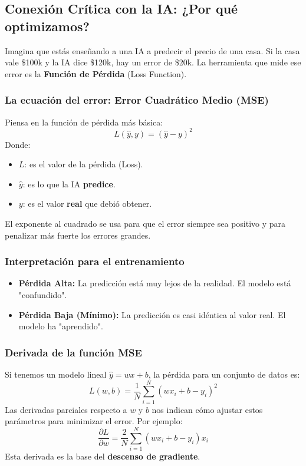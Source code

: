 \documentclass[12pt,a4paper,openany,oneside]{book}
\begin{document}
\subsection{Conexión Crítica con la IA: ¿Por qué optimizamos?}
Imagina que estás enseñando a una IA a predecir el precio de una casa. Si la casa vale \$100k y la IA dice \$120k, hay un error de \$20k. La herramienta que mide ese error es la \textbf{Función de Pérdida} (Loss Function).

\subsubsection{La ecuación del error: Error Cuadrático Medio (MSE)}
Piensa en la función de pérdida más básica:
\[
L(\hat{y}, y) = (\hat{y} - y)^2
\]
Donde:
\begin{itemize}
    \item $L$: es el valor de la pérdida (Loss).
    \item $\hat{y}$: es lo que la IA \textbf{predice}.
    \item $y$: es el valor \textbf{real} que debió obtener.
\end{itemize}
El exponente al cuadrado se usa para que el error siempre sea positivo y para penalizar más fuerte los errores grandes.

\subsubsection{Interpretación para el entrenamiento}
\begin{itemize}
    \item \textbf{Pérdida Alta:} La predicción está muy lejos de la realidad. El modelo está "confundido".
    \item \textbf{Pérdida Baja (Mínimo):} La predicción es casi idéntica al valor real. El modelo ha "aprendido".
\end{itemize}

\subsubsection{Derivada de la función MSE}
Si tenemos un modelo lineal $\hat{y} = wx + b$, la pérdida para un conjunto de datos es:
\[
L(w,b) = \frac{1}{N} \sum_{i=1}^{N} (wx_i + b - y_i)^2
\]
Las derivadas parciales respecto a $w$ y $b$ nos indican cómo ajustar estos parámetros para minimizar el error. Por ejemplo:
\[
\frac{\partial L}{\partial w} = \frac{2}{N} \sum_{i=1}^{N} (wx_i + b - y_i) x_i
\]
Esta derivada es la base del \textbf{descenso de gradiente}.
\end{document}
